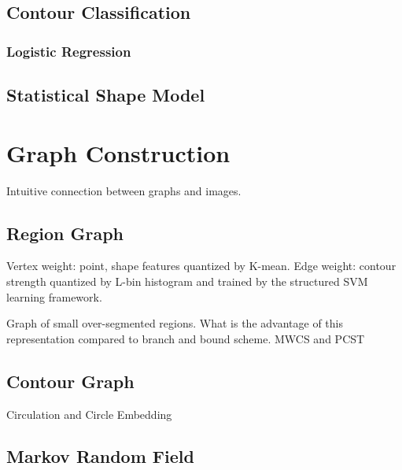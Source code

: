 \documentclass{SMBV12}
\begin{document}
\cite{tsochantaridis2006large}

\subsection{Contour Classification}

\subsubsection{Logistic Regression}

\subsection{Statistical Shape Model}

\cite{leventon2000statistical}




\section{Graph Construction}

Intuitive connection between graphs and images.

\subsection{Region Graph}

\cite{arbelaez2009contours}

Vertex weight: point, shape features quantized by K-mean.
Edge weight: contour strength quantized by L-bin histogram and trained by the structured SVM learning framework.

Graph of small over-segmented regions. What is the advantage of this representation compared to branch and bound scheme. MWCS and PCST

\subsection{Contour Graph}

Circulation and Circle Embedding

\subsection{Markov Random Field}
\end{document}
